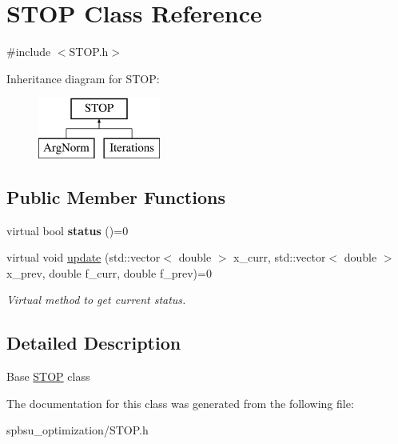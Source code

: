 \hypertarget{class_s_t_o_p}{}\section{S\+T\+OP Class Reference}
\label{class_s_t_o_p}


{\ttfamily \#include $<$S\+T\+O\+P.\+h$>$}

Inheritance diagram for S\+T\+OP\+:\begin{figure}[H]
\begin{center}
\leavevmode
\includegraphics[height=2.000000cm]{class_s_t_o_p}
\end{center}
\end{figure}
\subsection*{Public Member Functions}
\begin{DoxyCompactItemize}
\item 
\mbox{\label{class_s_t_o_p_a68218a1646b557bfce7bd9ce5fba94b8}} 
virtual bool {\bfseries status} ()=0
\item 
\mbox{\label{class_s_t_o_p_a0eb3d0b3458f6d5d5071338983ce0782}} 
virtual void \hyperlink{class_s_t_o_p_a0eb3d0b3458f6d5d5071338983ce0782}{update} (std\+::vector$<$ double $>$ x\+\_\+curr, std\+::vector$<$ double $>$ x\+\_\+prev, double f\+\_\+curr, double f\+\_\+prev)=0
\begin{DoxyCompactList}\small\item\em Virtual method to get current status. \end{DoxyCompactList}\end{DoxyCompactItemize}


\subsection{Detailed Description}
Base \hyperlink{class_s_t_o_p}{S\+T\+OP} class 

The documentation for this class was generated from the following file\+:\begin{DoxyCompactItemize}
\item 
spbsu\+\_\+optimization/S\+T\+O\+P.\+h\end{DoxyCompactItemize}
